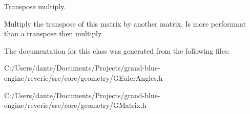 Transpose multiply. 

Multiply the transpose of this matrix by another matrix. Is more performant than a transpose then multiply 

The documentation for this class was generated from the following files\+:\begin{DoxyCompactItemize}
\item 
C\+:/\+Users/dante/\+Documents/\+Projects/grand-\/blue-\/engine/reverie/src/core/geometry/G\+Euler\+Angles.\+h\item 
C\+:/\+Users/dante/\+Documents/\+Projects/grand-\/blue-\/engine/reverie/src/core/geometry/G\+Matrix.\+h\end{DoxyCompactItemize}
